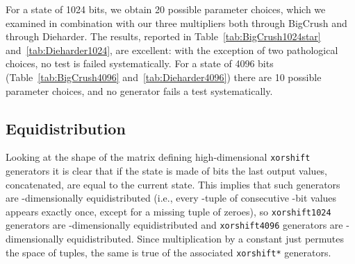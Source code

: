 \documentclass{acmsmalltr}
\newcommand{\xorshift}[1][]{\texttt{xorshift#1}\xspace}
\newcommand{\xorshifts}[1][]{\texttt{xorshift#1*}\xspace}
\begin{document}
For a state of 1024 bits, we obtain 20 possible parameter choices, which we examined in combination with our
three multipliers both through BigCrush and through Dieharder. The results, reported in 
Table~\ref{tab:BigCrush1024star} and~\ref{tab:Dieharder1024}, are excellent: 
with the exception of two pathological choices, no test is failed 
systematically. For a state of 4096 bits (Table~\ref{tab:BigCrush4096}
and~\ref{tab:Dieharder4096}) there are 10 possible parameter choices, 
and no generator fails a test systematically.




\subsection{Equidistribution}

Looking at the shape of the matrix defining high-dimensional \xorshift
generators it is clear that if the state is made of  bits the last
 output values, concatenated, are equal to the current state. This implies
that such generators are -dimensionally equidistributed (i.e.,
every -tuple of consecutive -bit values appears exactly once, except
for a missing tuple of zeroes), so \xorshift[1024] generators are -dimensionally
equidistributed and \xorshift[4096] generators are -dimensionally
equidistributed. Since multiplication by a constant just permutes the space of
tuples, the same is true of the associated \xorshifts generators.
\end{document}
